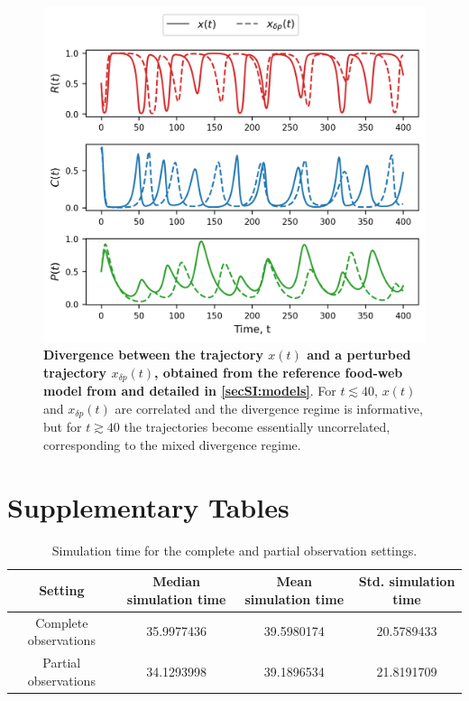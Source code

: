 \begin{figure}[h]
    \centering
    \includegraphics[]{figures/SI/perturbed_p.png}
    \caption{\textbf{Divergence between the trajectory $x(t)$ and a perturbed trajectory $x_{\delta p}(t)$, obtained from the reference food-web model from \cite{Hastings1991} and detailed in \cref{secSI:models}}. For $t \lesssim 40$, $x(t)$ and $x_{\delta p}(t)$ are correlated and the divergence regime is informative, but for $t \gtrsim 40$ the trajectories become essentially uncorrelated, corresponding to the mixed divergence regime. }
    \label{figSI:perturbed_p}
\end{figure}

\FloatBarrier

\section{Supplementary Tables}

\begin{table}[ht]
  \centering
    \begin{tabular}{c|c|c|c}
    Setting & Median simulation time & Mean simulation time & Std. simulation time\\
    \hline
    Complete observations & 35.9977436 & 39.5980174 & 20.5789433\\
    Partial observations & 34.1293998 & 39.1896534 & 21.8191709\\
    \end{tabular}
  \caption{Simulation time for the complete and partial observation settings.\\}
\label{tableSI:simul_time}
\end{table}

